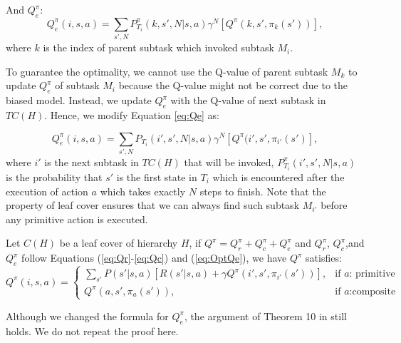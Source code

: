 And $Q_e^{\pi}$:
\begin{equation}
    Q_e^{\pi}(i, s, a) = \sum_{s', N} P_{T_i}^{\pi}(k, s', N|s, a)\gamma^N[Q^{\pi}(k, s', \pi_k(s'))],
    \label{eq:Qe}
\end{equation}
where $k$ is the index of parent subtask which invoked subtask $M_i$.

To guarantee the optimality, we cannot use the Q-value of parent subtask $M_k$ to update $Q_e^{\pi}$ of subtask $M_i$ because the 
Q-value might not be correct due to the biased model.  Instead, 
we update $Q_e^{\pi}$ with the Q-value of next subtask in $TC(H)$.
Hence, we modify Equation \ref{eq:Qe} as:

\begin{equation}
    Q_e^{\pi}(i, s, a) = \sum_{s', N} P_{T_i}(i', s', N|s, a)\gamma^N[Q^{\pi}(i', s', \pi_{i'}(s')],
    \label{eq:OptQe}
\end{equation}
where $i'$ is the next subtask in $TC(H)$ that will be invoked, $P_{T_i}^{\pi}(i', s', N|s, a)$ is the probability that $s'$ is the first state in $T_i$ which
is encountered after the execution of action $a$ which takes exactly $N$ steps to finish. 
Note that the property of leaf cover ensures that we can always find such subtask $M_{i'}$ before any primitive
action is executed. %

\begin{theorem}
    Let $C(H)$ be a leaf cover of hierarchy $H$, if $Q^{\pi} = Q_r^{\pi} + Q_c^{\pi} + Q_e^{\pi}$ and
    $Q_r^{\pi}$, $Q_c^{\pi}$,and $Q_e^{\pi}$ follow Equations (\ref{eq:Qr}-\ref{eq:Qc}) and (\ref{eq:OptQe}), we have $Q^{\pi}$ satisfies:
    \begin{equation*}
    Q^{\pi}(i, s, a) = 
    \left\{\begin{array}{ll}
        \sum_{s'}P(s'|s, a)[R(s'|s, a) + \gamma Q^{\pi}(i', s', \pi_{i'}(s'))], &\mbox{if $a$: primitive} \\
        Q^{\pi}(a, s', \pi_{a}(s')), &\mbox{if $a$:composite}
    \end{array} \right.
    \end{equation*}
    \label{thm:Bell}
\end{theorem}
Although we changed the formula for $Q_e^{\pi}$, the argument of Theorem 10 in \cite{HORDQ} still holds.
We do not repeat the proof here. 

